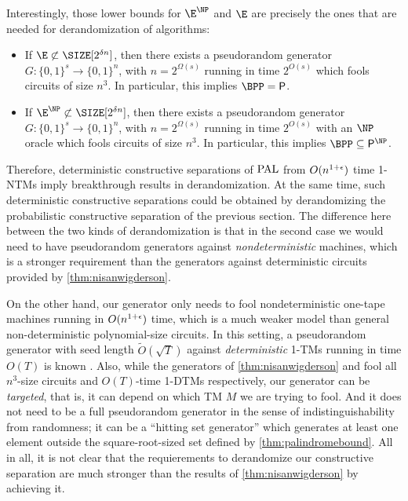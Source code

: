 Interestingly, those lower bounds for $\E^{\NP}$ and $\E$ are precisely the ones that are needed for derandomization of
algorithms:

\begin{theorem}[\cite{NW94, IW97}] 
    \label{thm:nisanwigderson}
    \begin{itemize}
    \item If $\E \not\subset \SIZE[2^{\delta n}]$, then there exists a pseudorandom generator $G : \{0, 1\}^s \to \{0, 1\}^n$,
    with $n = 2^{\Omega(s)}$ running in time $2^{O(s)}$ which fools circuits of size $n^3$.
    In particular, this implies $\BPP = \PTIME$. 
    \item If $\E^{\NP} \not\subset \SIZE[2^{\delta n}]$, then there exists a pseudorandom generator $G : \{0, 1\}^s \to \{0, 1\}^n$,
    with $n = 2^{\Omega(s)}$ running in time $2^{O(s)}$ with an $\NP$ oracle which fools circuits of size $n^3$.
    In particular, this implies $\BPP \subseteq \PTIME^\NP$. 
    \end{itemize}
\end{theorem}

Therefore, deterministic constructive separations of $\mathrm{PAL}$ from $O(n^{1+\epsilon})$ time 1-NTMs imply breakthrough results in
derandomization. At the same time, such deterministic constructive separations could be obtained by derandomizing the
probabilistic constructive separation of the previous section. The difference here between the two kinds of derandomization
is that in the second case we would need to have pseudorandom generators against \emph{nondeterministic} machines, which 
is a stronger requirement than the generators against deterministic circuits provided by \cref{thm:nisanwigderson}.

On the other hand, our generator only needs to fool nondeterministic one-tape machines running in $O(n^{1+\epsilon})$ time, 
which is a much weaker model than general non-deterministic polynomial-size circuits. In this setting, a pseudorandom
generator with seed length $\tilde{O}(\sqrt{T})$ against \emph{deterministic} 1-TMs running in time $O(T)$ is known 
\cite{Impagliazzo94}. Also, while the generators of \cref{thm:nisanwigderson} and \cite{Impagliazzo94} fool all 
$n^3$-size circuits and $O(T)$-time 1-DTMs respectively, our generator can be \emph{targeted}, that is, it can depend
on which TM $M$ we are trying to fool. And it does not need to be a full pseudorandom generator in the sense of 
indistinguishability from randomness; it can be a ``hitting set generator'' \cite{Andreev98} which generates at least
one element outside the square-root-sized set defined by \cref{thm:palindromebound}. All in all, it is not clear
that the requierements to derandomize our constructive separation are much stronger than the results of 
\cref{thm:nisanwigderson} by achieving it. 

